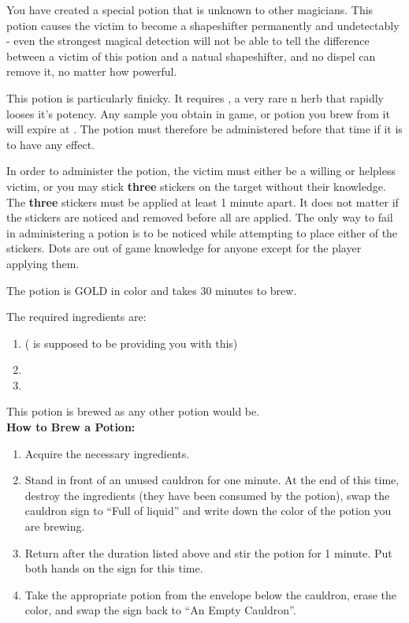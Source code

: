 \documentclass[green]{NeptuneBall}
\begin{document}
\name{\gShapeshifter{}}

You have created a special potion that is unknown to other magicians. This potion causes the victim to become a shapeshifter permanently and undetectably - even the strongest magical detection will not be able to tell the difference between a victim of this potion and a natual shapeshifter, and no dispel can remove it, no matter how powerful.

This potion is particularly finicky. It requires \iHemlock{}, a very rare \pPacifica{}n herb that rapidly looses it's potency. Any sample you obtain in game, or potion you brew from it will expire at \cTThree{\MYname{}}. The potion must therefore be administered before that time if it is to have any effect.

In order to administer the potion, the victim must either be a willing or helpless victim, or you may stick {\bf three} stickers on the target without their knowledge. The {\bf three} stickers must be applied at least 1 minute apart. It does not matter if the stickers are noticed and removed before all are applied. The only way to fail in administering a potion is to be noticed while attempting to place either of the stickers. Dots are out of game knowledge for anyone except for the player applying them.

The potion is GOLD in color and takes 30 minutes to brew. 

The required ingredients are:
\begin{enumerate}
\item \iHemlock{} (\cSpy{} is supposed to be providing you with this)
\item \iSquid{}
\item \iBarnacle{}
\end{enumerate}

This potion is brewed as any other potion would be.\\

{\bf How to Brew a Potion:}\\ %
\begin{enumerate}
  \item Acquire the necessary ingredients.
  \item Stand in front of an unused cauldron for one minute. At the end of this time, destroy the ingredients (they have been consumed by the potion), swap the cauldron sign to ``Full of liquid'' and write down the color of the potion you are brewing.
  \item Return after the duration listed above and stir the potion for 1 minute. Put both hands on the sign for this time.
  \item Take the appropriate potion from the envelope below the cauldron, erase the color, and swap the sign back to ``An Empty Cauldron''.
\end{enumerate}
\end{document}
